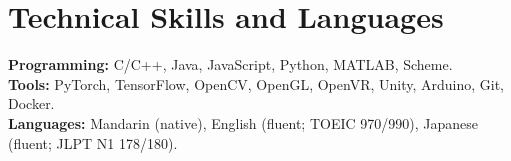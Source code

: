 \documentclass[10pt,a4paper]{article}
\begin{document}
\section*{Technical Skills and Languages}
\textbf{Programming:} C/C++, Java, JavaScript, Python, MATLAB, Scheme.\\
\textbf{Tools:} PyTorch, TensorFlow, OpenCV, OpenGL, OpenVR, Unity, Arduino, Git, Docker.\\
\textbf{Languages:} Mandarin (native), English (fluent; TOEIC 970/990), Japanese (fluent; JLPT N1 178/180).
\end{document}
